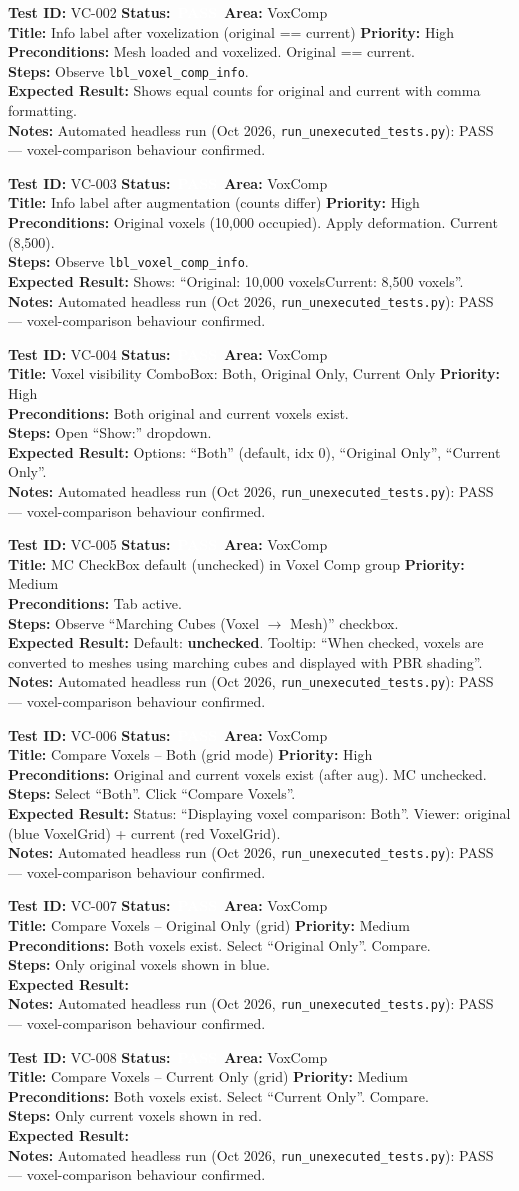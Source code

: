 \documentclass[12pt,a4paper]{article}
\newcommand{\statuspass}{\colorbox{statusgreen}{\textcolor{white}{\textbf{\,PASS\,}}}}
\newcommand{\testcase}[9]{%
  \smallskip
  \noindent\textbf{Test ID:} #1 \hfill \textbf{Status:} #2 \hfill \textbf{Area:} #3 \\
  \textbf{Title:} #4 \hfill \textbf{Priority:} #5 \\[0.3em]
  \textbf{Preconditions:} #6 \\[0.3em]
  \textbf{Steps:} #7 \\[0.3em]
  \textbf{Expected Result:} #8 \\
  \textbf{Notes:} #9
  \smallskip
}
\begin{document}
\testcase{VC-002}{\statuspass}{VoxComp}{Info label after voxelization (original == current)}{High}{Mesh loaded and voxelized. Original == current.}{Observe \texttt{lbl\_voxel\_comp\_info}.}{Shows equal counts for original and current with comma formatting.}{Automated headless run (Oct 2026, \texttt{run\_unexecuted\_tests.py}): PASS --- voxel-comparison behaviour confirmed.}


\testcase{VC-003}{\statuspass}{VoxComp}{Info label after augmentation (counts differ)}{High}{Original voxels (10,000 occupied). Apply deformation. Current (8,500).}{Observe \texttt{lbl\_voxel\_comp\_info}.}{Shows: ``Original: 10,000 voxels\quad Current: 8,500 voxels''.}{Automated headless run (Oct 2026, \texttt{run\_unexecuted\_tests.py}): PASS --- voxel-comparison behaviour confirmed.}


\testcase{VC-004}{\statuspass}{VoxComp}{Voxel visibility ComboBox: Both, Original Only, Current Only}{High}{Both original and current voxels exist.}{Open ``Show:'' dropdown.}{Options: ``Both'' (default, idx 0), ``Original Only'', ``Current Only''.}{Automated headless run (Oct 2026, \texttt{run\_unexecuted\_tests.py}): PASS --- voxel-comparison behaviour confirmed.}


\testcase{VC-005}{\statuspass}{VoxComp}{MC CheckBox default (unchecked) in Voxel Comp group}{Medium}{Tab active.}{Observe ``Marching Cubes (Voxel $\rightarrow$ Mesh)'' checkbox.}{Default: \textbf{unchecked}. Tooltip: ``When checked, voxels are converted to meshes using marching cubes and displayed with PBR shading''.}{Automated headless run (Oct 2026, \texttt{run\_unexecuted\_tests.py}): PASS --- voxel-comparison behaviour confirmed.}


\testcase{VC-006}{\statuspass}{VoxComp}{Compare Voxels -- Both (grid mode)}{High}{Original and current voxels exist (after aug). MC unchecked.}{Select ``Both''. Click ``Compare Voxels''.}{Status: ``Displaying voxel comparison: Both''. Viewer: original (blue VoxelGrid) + current (red VoxelGrid).}{Automated headless run (Oct 2026, \texttt{run\_unexecuted\_tests.py}): PASS --- voxel-comparison behaviour confirmed.}


\testcase{VC-007}{\statuspass}{VoxComp}{Compare Voxels -- Original Only (grid)}{Medium}{Both voxels exist. Select ``Original Only''. Compare.}{Only original voxels shown in blue.}{}{Automated headless run (Oct 2026, \texttt{run\_unexecuted\_tests.py}): PASS --- voxel-comparison behaviour confirmed.}


\testcase{VC-008}{\statuspass}{VoxComp}{Compare Voxels -- Current Only (grid)}{Medium}{Both voxels exist. Select ``Current Only''. Compare.}{Only current voxels shown in red.}{}{Automated headless run (Oct 2026, \texttt{run\_unexecuted\_tests.py}): PASS --- voxel-comparison behaviour confirmed.}
\end{document}
